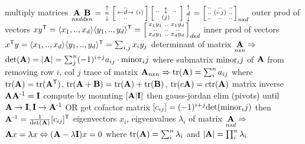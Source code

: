 \documentclass[10pt]{article}
\begin{document}
\NEW    multiply matrices  $\underset{n\mathsf{x} d}{{\mathbf{A}}}\underset{d\mathsf{x} n}{{\mathbf{B}}} = \begin{smallmatrix}\uparrow \\n\\ \downarrow \end{smallmatrix} \left[\begin{smallmatrix} ..&\\ \leftarrow d \rightarrow &(i)\\..&\end{smallmatrix}\right] \left[\begin{smallmatrix} \\..&\updownarrow &..\\ &(j)& &\end{smallmatrix}\right] \begin{smallmatrix}\uparrow \\ d \\ \downarrow \end{smallmatrix} = \left[\begin{smallmatrix} ..&..&..\\..& (i\cdot j) &..\\..&..&..\end{smallmatrix}\right]_{n\mathsf{x} d}$
\NEW    outer prod of vectors $xy^{\mathsf{T}} = \langle x_1,..,x_d \rangle \langle y_1,..,y_d \rangle^{\mathsf{T}} = \left[\begin{smallmatrix} x_1y_1 &..& x_1y_d \\..&..&..\\ x_dy_1 &..& x_dy_d \end{smallmatrix}\right]_{d\mathsf{x} d}$
\NEW    inner prod of vectors $x^{\mathsf{T}} y = \langle x_1,..,x_d \rangle \langle y_1,..,y_d \rangle^{\mathsf{T}} = \sum_{i,j} x_iy_j$
\NEW    determinant of matrix  $\underset{n\mathsf{x} n}{{\mathbf{A}}} \Rightarrow$ $\mathrm{det}({\mathbf{A}}) = |{\mathbf{A}}| = \sum_j^n (-1)^{i+j} a_{ij} \cdot \mathrm{minor}_ij$ where submatrix $\mathrm{minor}_ij$ of ${\mathbf{A}}$ from removing row $i$, col $j$
\NEW    trace of matrix ${\mathbf{A}}_{n\mathsf{x} n} \Rightarrow \mathrm{tr}({\mathbf{A}}) = \sum_i^n a_{ij}$ where $\mathrm{tr}({\mathbf{A}}) = \mathrm{tr}({\mathbf{A}}^{\mathsf{T}})$, $\mathrm{tr}({\mathbf{A}}+{\mathbf{B}}) = \mathrm{tr}({\mathbf{A}}) + \mathrm{tr}({\mathbf{B}})$, $\mathrm{tr}(c{\mathbf{A}}) = c \mathrm{tr}({\mathbf{A}})$
\NEW    matrix inverse ${\mathbf{A}}{\mathbf{A}}^{\text{-}1} = {\mathbf{I}}$ compute by mounting $[{\mathbf{A}} | {\mathbf{I}}]$ then gauss-jordan elim (pivots) until ${\mathbf{A}} \rightarrow {\mathbf{I}}, {\mathbf{I}} \rightarrow {\mathbf{A}}^{\text{-}1}$
\NEW    OR get cofactor matrix $[ c_{ij} ] = (-1)^{i+j} \mathrm{det}(\mathrm{minor}_ij)$ then ${\mathbf{A}}^{\text{-}1} = \frac{1}{\mathrm{det}({\mathbf{A}})} [c_{ij}]^{\mathsf{T}}$
\NEW    eigenvectors $x_i$, eigvenvalues $\lambda_i$ of matrix $\underset{n\mathsf{x} d}{{\mathbf{A}}} \Rightarrow$ ${\mathbf{A}}x = \lambda x \Leftrightarrow ({\mathbf{A}}-\lambda {\mathbf{I}})x = 0$ where $\mathrm{tr}({\mathbf{A}}) = \sum_i^n \lambda_i$ and $|{\mathbf{A}}| = \prod_i^n \lambda_i$
\end{document}
